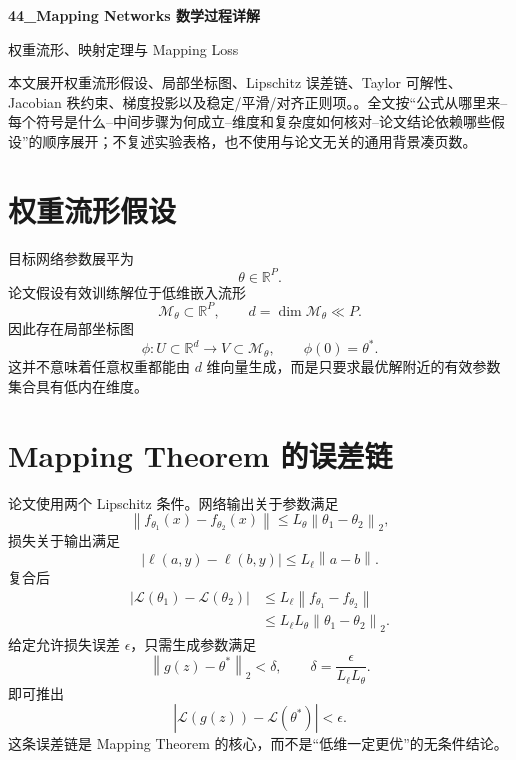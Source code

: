 \documentclass[UTF8,12pt,a4paper,fontset=none]{ctexart}
\numberwithin{equation}{section}
\newcommand{\R}{\mathbb{R}}
\newcommand{\Loss}{\mathcal{L}}
\newcommand{\norm}[1]{\left\lVert #1\right\rVert}
\begin{document}
\begin{center}
{\LARGE\bfseries 44\_Mapping Networks 数学过程详解}\par
\vspace{0.35em}
{\large 权重流形、映射定理与 Mapping Loss}
\end{center}
\vspace{0.45em}
\begin{keybox}[本文只处理真正需要推导的部分]
本文展开权重流形假设、局部坐标图、Lipschitz 误差链、Taylor 可解性、Jacobian 秩约束、梯度投影以及稳定/平滑/对齐正则项。。全文按“公式从哪里来--每个符号是什么--中间步骤为何成立--维度和复杂度如何核对--论文结论依赖哪些假设”的顺序展开；不复述实验表格，也不使用与论文无关的通用背景凑页数。
\end{keybox}
\tableofcontents
\newpage

\section{权重流形假设}
目标网络参数展平为
\begin{equation}
 \theta\in\R^P.
\end{equation}
论文假设有效训练解位于低维嵌入流形
\begin{equation}
 \mathcal M_\theta\subset\R^P,
 \qquad d=\dim\mathcal M_\theta\ll P.
\end{equation}
因此存在局部坐标图
\begin{equation}
 \phi:U\subset\R^d\to V\subset\mathcal M_\theta,
 \qquad \phi(0)=\theta^*.
\end{equation}
这并不意味着任意权重都能由 $d$ 维向量生成，而是只要求最优解附近的有效参数集合具有低内在维度。

\section{Mapping Theorem 的误差链}
论文使用两个 Lipschitz 条件。网络输出关于参数满足
\begin{equation}
 \norm{f_{\theta_1}(x)-f_{\theta_2}(x)}
 \le L_\theta\norm{\theta_1-\theta_2}_2,
\end{equation}
损失关于输出满足
\begin{equation}
 |\ell(a,y)-\ell(b,y)|\le L_\ell\norm{a-b}.
\end{equation}
复合后
\begin{align}
 |\Loss(\theta_1)-\Loss(\theta_2)|
 &\le L_\ell\norm{f_{\theta_1}-f_{\theta_2}}\\
 &\le L_\ell L_\theta\norm{\theta_1-\theta_2}_2.
\end{align}
给定允许损失误差 $\epsilon$，只需生成参数满足
\begin{equation}
 \norm{g(z)-\theta^*}_2<\delta,
 \qquad
 \delta=\frac{\epsilon}{L_\ell L_\theta}.
\end{equation}
即可推出
\begin{equation}
 \boxed{|\Loss(g(z))-\Loss(\theta^*)|<\epsilon.}
\end{equation}
这条误差链是 Mapping Theorem 的核心，而不是“低维一定更优”的无条件结论。
\end{document}
